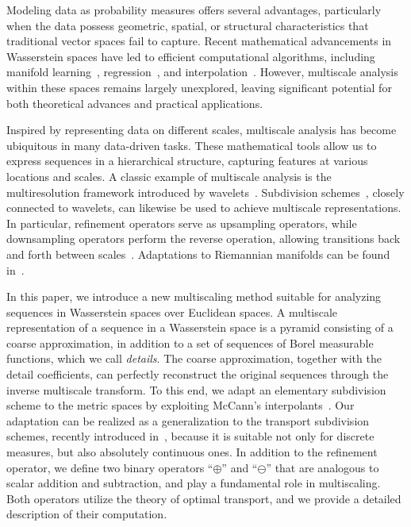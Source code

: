 \documentclass[12pt]{amsart}
\begin{document}
Modeling data as probability measures offers several advantages, particularly when the data possess geometric, spatial, or structural characteristics that traditional vector spaces fail to capture. Recent mathematical advancements in Wasserstein spaces have led to efficient computational algorithms, including manifold learning~\cite{hamm2025manifold}, regression~\cite{chen2023wasserstein}, and interpolation~\cite{chewi2021fast, fan2024conditional}. However, multiscale analysis within these spaces remains largely unexplored, leaving significant potential for both theoretical advances and practical applications.

Inspired by representing data on different scales, multiscale analysis has become ubiquitous in many data-driven tasks. These mathematical tools allow us to express sequences in a hierarchical structure, capturing features at various locations and scales. A classic example of multiscale analysis is the multiresolution framework introduced by wavelets~\cite{daubechies1992ten}. Subdivision schemes~\cite{dyn2002subdivision}, closely connected to wavelets, can likewise be used to achieve multiscale representations. In particular, refinement operators serve as upsampling operators, while downsampling operators perform the reverse operation, allowing transitions back and forth between scales~\cite{dyn2021linear, donoho1992interpolating}. Adaptations to Riemannian manifolds can be found in~\cite{wallner2020geometric, mattar2023pyramid, rahman2005multiscale}.

In this paper, we introduce a new multiscaling method suitable for analyzing sequences in Wasserstein spaces over Euclidean spaces. A multiscale representation of a sequence in a Wasserstein space is a pyramid consisting of a coarse approximation, in addition to a set of sequences of Borel measurable functions, which we call \emph{details}. The coarse approximation, together with the detail coefficients, can perfectly reconstruct the original sequences through the inverse multiscale transform. To this end, we adapt an elementary subdivision scheme to the metric spaces by exploiting McCann's interpolants~\cite{mccann1997convexity}. Our adaptation can be realized as a generalization to the transport subdivision schemes, recently introduced in~\cite{baccou2024subdivision}, because it is suitable not only for discrete measures, but also absolutely continuous ones. In addition to the refinement operator, we define two binary operators ``$\oplus$'' and ``$\ominus$'' that are analogous to scalar addition and subtraction, and play a fundamental role in multiscaling. Both operators utilize the theory of optimal transport, and we provide a detailed description of their computation.
\end{document}
